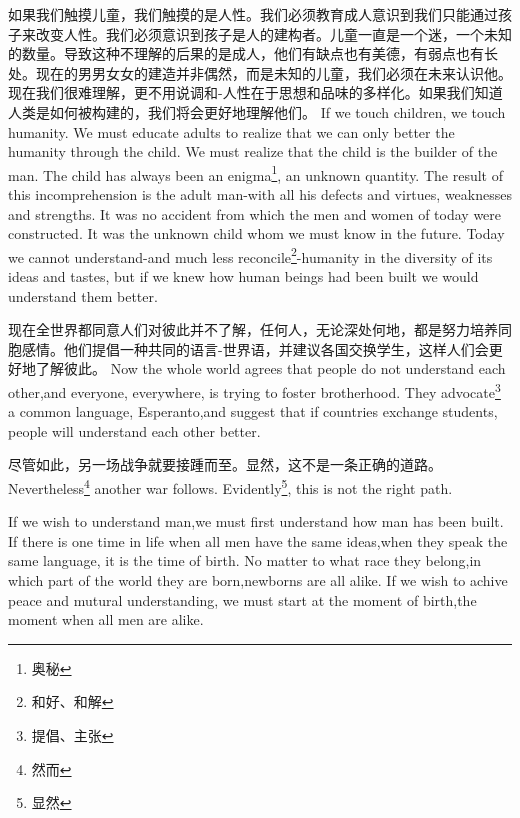 \documentclass[lang=cn,10pt]{elegantbook}
\begin{document}
\begin{tcolorbox}[title=译文,
colback=red!5!white,
colframe=red!75!black,
fonttitle=\bfseries]
如果我们触摸儿童，我们触摸的是人性。我们必须教育成人意识到我们只能通过孩子来改变人性。我们必须意识到孩子是人的建构者。儿童一直是一个迷，一个未知的数量。导致这种不理解的后果的是成人，他们有缺点也有美德，有弱点也有长处。现在的男男女女的建造并非偶然，而是未知的儿童，我们必须在未来认识他。现在我们很难理解，更不用说调和-人性在于思想和品味的多样化。如果我们知道人类是如何被构建的，我们将会更好地理解他们。
If we touch children, we touch humanity. We must educate adults to realize that we can only better the humanity through the child. We must realize that the child is the builder of the man. The child has always been an enigma\footnote{奥秘}, an unknown quantity. The result of this incomprehension is the adult man-with all his defects and virtues, weaknesses and strengths. It was no accident from which the men and women of today were constructed. It was the unknown child whom we must know in the future. Today we cannot understand-and much less reconcile\footnote{和好、和解}-humanity in the diversity of its ideas and tastes, but if we knew how human beings had been built we would understand them better.
\end{tcolorbox}

\begin{tcolorbox}[title=译文,
colback=red!5!white,
colframe=red!75!black,
fonttitle=\bfseries]
现在全世界都同意人们对彼此并不了解，任何人，无论深处何地，都是努力培养同胞感情。他们提倡一种共同的语言-世界语，并建议各国交换学生，这样人们会更好地了解彼此。
Now the whole world agrees that people do not understand each other,and everyone, everywhere, is trying to foster brotherhood. They advocate\footnote{提倡、主张} a common language, Esperanto,and suggest that if countries exchange students, people will understand each other better.
\end{tcolorbox}

\begin{tcolorbox}[title=译文,
colback=red!5!white,
colframe=red!75!black,
fonttitle=\bfseries]
尽管如此，另一场战争就要接踵而至。显然，这不是一条正确的道路。
Nevertheless\footnote{然而} another war follows. Evidently\footnote{显然}, this is not the right path.
\end{tcolorbox}

If we wish to understand man,we must first understand how man has been built. If there is one time in life when all men have the same ideas,when they speak the same language, it is the time of birth. No matter to what race they belong,in which part of the world they are born,newborns are all alike. If we wish to achive peace and mutural understanding, we must start at the moment of birth,the moment when all men are alike.
\end{document}
